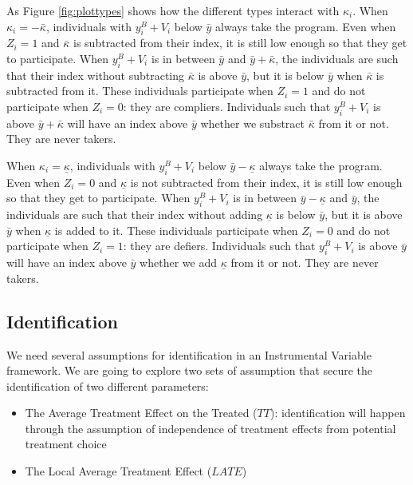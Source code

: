 \documentclass[]{book}
\providecommand{\tightlist}{%
  \setlength{\itemsep}{0pt}\setlength{\parskip}{0pt}}
\theoremstyle{definition}
\theoremstyle{definition}
\theoremstyle{definition}
\theoremstyle{remark}
\begin{document}
As Figure \ref{fig:plottypes} shows how the different types interact with \(\kappa_i\).
When \(\kappa_i=-\bar{\kappa}\), individuals with \(y_i^B+V_i\) below \(\bar{y}\) always take the program.
Even when \(Z_i=1\) and \(\bar{\kappa}\) is subtracted from their index, it is still low enough so that they get to participate.
When \(y_i^B+V_i\) is in between \(\bar{y}\) and \(\bar{y}+\bar{\kappa}\), the individuals are such that their index without subtracting \(\bar{\kappa}\) is above \(\bar{y}\), but it is below \(\bar{y}\) when \(\bar{\kappa}\) is subtracted from it.
These individuals participate when \(Z_i=1\) and do not participate when \(Z_i=0\): they are compliers.
Individuals such that \(y_i^B+V_i\) is above \(\bar{y}+\bar{\kappa}\) will have an index above \(\bar{y}\) whether we substract \(\bar{\kappa}\) from it or not.
They are never takers.

When \(\kappa_i=\underline{\kappa}\), individuals with \(y_i^B+V_i\) below \(\bar{y}-\underline{\kappa}\) always take the program.
Even when \(Z_i=0\) and \(\underline{\kappa}\) is not subtracted from their index, it is still low enough so that they get to participate.
When \(y_i^B+V_i\) is in between \(\bar{y}-\underline{\kappa}\) and \(\bar{y}\), the individuals are such that their index without adding \(\underline{\kappa}\) is below \(\bar{y}\), but it is above \(\bar{y}\) when \(\underline{\kappa}\) is added to it.
These individuals participate when \(Z_i=0\) and do not participate when \(Z_i=1\): they are defiers.
Individuals such that \(y_i^B+V_i\) is above \(\bar{y}\) will have an index above \(\bar{y}\) whether we add \(\underline{\kappa}\) from it or not.
They are never takers.

\hypertarget{identification-4}{%
\subsection{Identification}\label{identification-4}}

We need several assumptions for identification in an Instrumental Variable framework.
We are going to explore two sets of assumption that secure the identification of two different parameters:

\begin{itemize}
\tightlist
\item
  The Average Treatment Effect on the Treated (\(TT\)): identification will happen through the assumption of independence of treatment effects from potential treatment choice
\item
  The Local Average Treatment Effect (\(LATE\))
\end{itemize}
\end{document}
